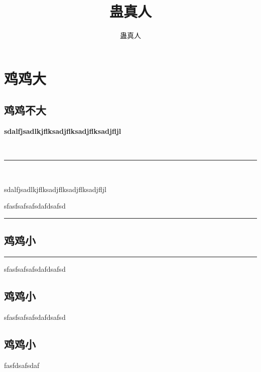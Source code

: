 \documentclass[hyperref,UTF8]{ctexrep}
\title{蛊真人}
\author{蛊真人}
\newenvironment{thisBody}
	{
		\zihao{3}
	}%
	{
		\clearpage
	}%
\begin{document}
 
\maketitle%
 

 


\chapter{鸡鸡大}

\setcounter{secnumdepth}{-2}
\section{鸡鸡不大}
\setcounter{secnumdepth}{3}

	\begin{thisBody} 
		\textbf {sdalfjsadlkjflksadjflksadjflksadjfljl}

\noindent \, \hfill \rule[0.5ex]{0.95\linewidth}{0.5pt} \hfill \,

		\dag \hfill sdalfjsadlkjflksadjflksadjflksadjfljl \hfill \dag 

		sfasfsafsafsdafdsafsd
	\end{thisBody}

\noindent\rule[0.5ex]{\columnwidth}{0.6pt}
\section{鸡鸡小}
\noindent\rule[0.5ex]{\columnwidth}{0.6pt}

	\begin{thisBody} 
		sfasfsafsafsdafdsafsd
	\end{thisBody}
\section{鸡鸡小}
	\begin{thisBody} 
		sfasfsafsafsdafdsafsd
	\end{thisBody}
\section{鸡鸡小}
	\begin{thisBody} 
		fasfdsafsdaf 
	\end{thisBody}
\end{document}
